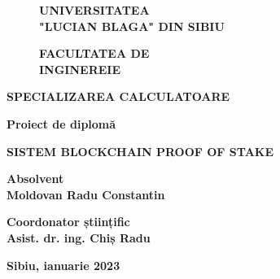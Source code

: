 \begin{titlepage}
    \begin{figure}[!htb]
        \centering
        \begin{minipage}{0.5\textwidth}
            \large
            \vspace{0.2cm}
            \begin{center}
                \textbf{UNIVERSITATEA \\
                    "LUCIAN BLAGA" DIN SIBIU}
            \end{center}
            \vspace{0.3cm}
            \begin{center}
                \textbf{
                    FACULTATEA DE \\
                    INGINEREIE
                }
            \end{center}
        \end{minipage}
    \end{figure}

    \begin{center}
        \textbf{SPECIALIZAREA CALCULATOARE}
    \end{center}

    \vspace{1cm}

    \begin{center}
        \Large \textbf{Proiect de diplomă}
    \end{center}

    \begin{center}
        \huge \textbf{\MakeUppercase{Sistem blockchain proof of stake}}
    \end{center}

    \vspace{3cm}

    \begin{center}
        \large \textbf{Absolvent \\ Moldovan Radu Constantin}
    \end{center}

    \vspace{0.25cm}

    \begin{center}
        \large \textbf{Coordonator științific \\ Asist. dr. ing. Chiș Radu}
    \end{center}

    \vspace{2cm}

    \begin{center}
        \Large \textbf{Sibiu, ianuarie 2023}
    \end{center}
\end{titlepage}